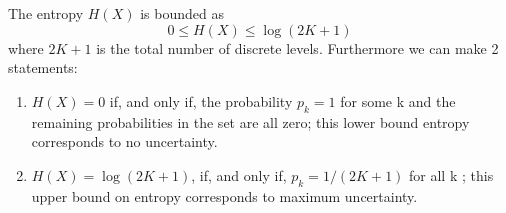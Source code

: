 \documentclass[11pt]{article}
\begin{document}
The entropy $H(X)$ is bounded as 
\begin{equation}
	0 \leq H(X) \leq \log(2K + 1)
\end{equation}
where  $2K + 1$ is the total number of discrete levels. Furthermore we can make 2 statements:

\begin{enumerate}
	\item $H(X) = 0$ if, and only if, the probability $p_k = 1$ for some k and the remaining probabilities in the set are all zero; this lower bound entropy corresponds to no uncertainty.
	\item $H(X) = \log(2K + 1)$, if, and only if, $p_k = 1 / (2K + 1)$ for all k ; this upper bound on entropy corresponds to maximum uncertainty.
	
\end{enumerate}
\end{document}
